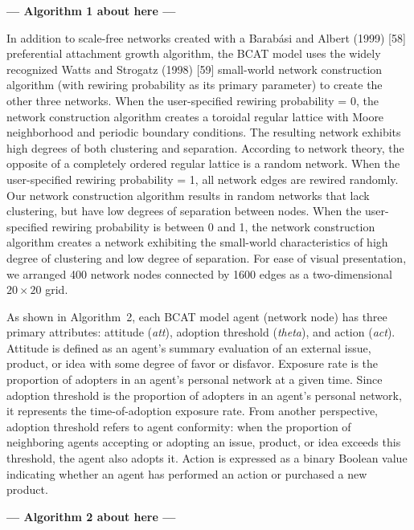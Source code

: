 \documentclass[10pt,letterpaper]{article}
\begin{document}


\begin{center}\textbf{--- Algorithm 1 about here ---}\end{center}


In addition to scale-free networks created with a Barab{\'a}si and Albert (1999) [58] preferential attachment growth algorithm, the BCAT model uses the widely recognized Watts and Strogatz (1998) [59] small-world network construction algorithm (with rewiring probability as its primary parameter) to create the other three networks. When the user-specified rewiring probability = 0, the network construction algorithm creates a toroidal regular lattice with Moore neighborhood and periodic boundary conditions. The resulting network exhibits high degrees of both clustering and separation. According to network theory, the opposite of a completely ordered regular lattice is a random network. When the user-specified rewiring probability = 1, all network edges are rewired randomly. Our network construction algorithm results in random networks that lack clustering, but have low degrees of separation between nodes. When the user-specified rewiring probability is between 0 and 1, the network construction algorithm creates a network exhibiting the small-world characteristics of high degree of clustering and low degree of separation. For ease of visual presentation, we arranged 400 network nodes connected by 1600 edges as a two-dimensional $20 \times 20$ grid.

As shown in Algorithm~2, each BCAT model agent (network node) has three primary attributes: attitude (\textit{att}), adoption threshold (\textit{theta}), and action (\textit{act}). Attitude is defined as an agent's summary evaluation of an external issue, product, or idea with some degree of favor or disfavor. Exposure rate is the proportion of adopters in an agent's personal network at a given time. Since adoption threshold is the proportion of adopters in an agent's personal network, it represents the time-of-adoption exposure rate. From another perspective, adoption threshold refers to agent conformity: when the proportion of neighboring agents accepting or adopting an issue, product, or idea exceeds this threshold, the agent also adopts it. Action is expressed as a binary Boolean value indicating whether an agent has performed an action or purchased a new product.



\begin{center}\textbf{--- Algorithm 2 about here ---}\end{center}
\end{document}
